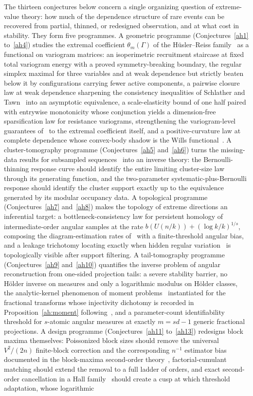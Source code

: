 \documentclass[11pt]{article}
\theoremstyle{definition}
\begin{document}
The thirteen conjectures below concern a single organizing question of extreme-value theory: how much of the dependence structure of rare events can be recovered from partial, thinned, or redesigned observation, and at what cost in stability.  They form five programmes.  A geometric programme (Conjectures~\ref{ah1} to~\ref{ah4}) studies the extremal coefficient $\theta_m(\Gamma)$ of the H\"usler--Reiss family~\cite{HR89,EH20} as a functional on variogram matrices: an isoperimetric recruitment staircase at fixed total variogram energy with a proved symmetry-breaking boundary, the regular simplex maximal for three variables and at weak dependence but strictly beaten below it by configurations carrying fewer active components, a pairwise closure law at weak dependence sharpening the consistency inequalities of Schlather and Tawn~\cite{ST02} into an asymptotic equivalence, a scale-elasticity bound of one half paired with entrywise monotonicity whose conjunction yields a dimension-free sparsification law for resistance variograms, strengthening the variogram-level guarantees of~\cite{EAR26} to the extremal coefficient itself, and a positive-curvature law at complete dependence whose convex-body shadow is the Wills functional~\cite{Vit96}.  A cluster-tomography programme (Conjectures~\ref{ah5} and~\ref{ah6}) turns the missing-data results for subsampled sequences~\cite{RT00,MF04,HS08} into an inverse theory: the Bernoulli-thinning response curve should identify the entire limiting cluster-size law through its generating function, and the two-parameter systematic-plus-Bernoulli response should identify the cluster support exactly up to the equivalence generated by its modular occupancy data.  A topological programme (Conjectures~\ref{ah7} and~\ref{ah8}) makes the topology of extreme directions an inferential target: a bottleneck-consistency law for persistent homology of intermediate-order angular samples at the rate $b(U(n/k))+(\log k/k)^{1/s}$, composing the diagram-estimation rates of~\cite{CGLM15} with a finite-threshold angular bias, and a leakage trichotomy locating exactly when hidden regular variation~\cite{Res08,MR11} is topologically visible after support filtering.  A tail-tomography programme (Conjectures~\ref{ah9} and~\ref{ah10}) quantifies the inverse problem of angular reconstruction from one-sided projection tails: a severe stability barrier, no H\"older inverse on measures and only a logarithmic modulus on H\"older classes, the analytic-kernel phenomenon of moment problems~\cite{Tal87} instantiated for the fractional transforms whose injectivity dichotomy is recorded in Proposition~\ref{ah:moment} following~\cite{MN21,CT19}, and a parameter-count identifiability threshold for $s$-atomic angular measures at exactly $m=sd-1$ generic fractional projections.  A design programme (Conjectures~\ref{ah11} to~\ref{ah13}) redesigns block maxima themselves: Poissonized block sizes should remove the universal $V^2/(2n)$ finite-block correction and the corresponding $n^{-1}$ estimator bias documented in the block-maxima second-order theory~\cite{BVZ19,DF19,BZ21}, factorial-cumulant matching should extend the removal to a full ladder of orders, and exact second-order cancellation in a Hall family~\cite{Hall82} should create a cusp at which threshold adaptation, whose logarithmic 
\end{document}
